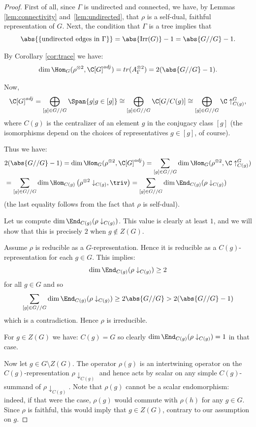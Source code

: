 \begin{proof}
First of all, since $\Gamma$ is undirected and connected, we have, by Lemmas \ref{lem:connectivity} and~\ref{lem:undirected}, that $\rho$ is a self-dual, faithful representation of $G$. Next, the condition that $\Gamma$ is a tree implies that $$\abs{\{\text{undirected edges in } \Gamma\}} = \abs{\mathrm{Irr}(G)}-1 = \abs{G//G} -1.$$

By Corollary \ref{cor:trace} we have:
 \begin{equation}\label{eq:sq_char}
\dim \Hom_G(\rho^{\otimes 2}, \C[G]^{adj}) = tr(A_{\Gamma}^{\otimes 2})= 2(\abs{G//G} -1).  
 \end{equation}

 Now, 
 $$\C[G]^{adj} = \bigoplus_{[g] \in G//G} \Span\{g |g\in [g]\} \cong \bigoplus_{[g] \in G//G} \C[G/C(g)] \cong \bigoplus_{[g] \in G//G} \C\uparrow^G_{C(g)}, $$
 where $C(g)$ is the centralizer of an element $g$ in the conjugacy class $[g]$ (the isomorphisms depend on the choices of representatives $g\in [g]$, of course).
 
 
 Thus we have:
\begin{align}\label{eq:sum_dim_end}
 \nonumber&2(\abs{G//G} -1) = \dim \Hom_G(\rho^{\otimes 2}, \C[G]^{adj})  = \sum_{[g] \in G//G} \dim \Hom_G(\rho^{\otimes 2}, \C\uparrow^G_{C(g)} )  \\ &=\sum_{[g] \in G//G} \dim \Hom_{C(g)}\left(\rho^{\otimes 2} \downarrow_{C(g)}, \triv\right)= \sum_{[g] \in G//G}  \dim \End_{C(g)}(\rho \downarrow_{C(g)})
\end{align}
(the last equality follows from the fact that $\rho$ is self-dual). 


Let us compute $ \dim \End_{C(g)}(\rho \downarrow_{C(g)})$. This value is clearly at least $1$, and we will show that this is precisely $2$ when $g\notin Z(G)$.


Assume $\rho$ is reducible as a $G$-representation. Hence it is reducible as a $C(g)$-representation for each $g\in G$. This implies: $$\dim \End_{C(g)}(\rho \downarrow_{C(g)})\geq 2$$ for all $g\in G$ and so $$\sum_{[g] \in G//G}  \dim \End_{C(g)}(\rho \downarrow_{C(g)}) \geq 2\abs{G//G} >2(\abs{G//G} -1)$$ which is a contradiction. Hence $\rho$ is irreducible.  

For $g\in Z(G)$ we have: $C(g)=G$ so clearly $ \dim \End_{C(g)}(\rho \downarrow_{C(g)})=1$ in that case.


Now let $g\in G \setminus Z(G)$. The operator $\rho(g)$ is an intertwining operator on the $C(g)$-representation $\rho \downarrow_{C(g)}$ and hence acts by scalar on any simple $C(g)$-summand of $\rho \downarrow_{C(g)}$. Note that $\rho(g)$ cannot be a scalar endomorphism: indeed, if that were the case, $\rho(g)$ would commute with $\rho(h)$ for any $g\in G$. Since $\rho$ is faithful, this would imply that $g \in Z(G)$, contrary to our assumption on $g$.





\end{proof}
